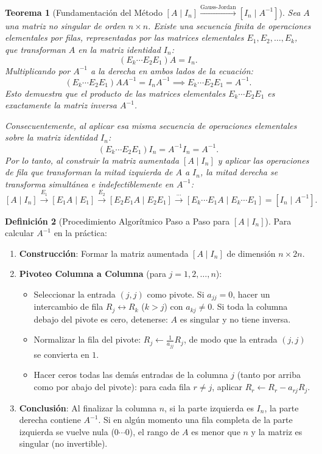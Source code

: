 \documentclass[11pt,letterpaper]{article}
\theoremstyle{definition}
\newtheorem{definicion}{Definición}[section]
\theoremstyle{plain}
\newtheorem{teorema}[definicion]{Teorema}
\begin{document}
\begin{teorema}[{Fundamentación del Método $[A \mid I_n] \xrightarrow{\text{Gauss-Jordan}} [I_n \mid A^{-1}]$}]
Sea $A$ una matriz no singular de orden $n\times n$. Existe una secuencia finita de operaciones elementales por filas, representadas por las matrices elementales $E_1, E_2, \ldots, E_k$, que transforman $A$ en la matriz identidad $I_n$:
\[
(E_k \cdots E_2 E_1) A = I_n.
\]
Multiplicando por $A^{-1}$ a la derecha en ambos lados de la ecuación:
\[
(E_k \cdots E_2 E_1) A A^{-1} = I_n A^{-1} \implies E_k \cdots E_2 E_1 = A^{-1}.
\]
Esto demuestra que el producto de las matrices elementales $E_k \cdots E_2 E_1$ es exactamente la matriz inversa $A^{-1}$.

Consecuentemente, al aplicar esa misma secuencia de operaciones elementales sobre la matriz identidad $I_n$:
\[
(E_k \cdots E_2 E_1) I_n = A^{-1} I_n = A^{-1}.
\]
Por lo tanto, al construir la matriz aumentada $[A \mid I_n]$ y aplicar las operaciones de fila que transforman la mitad izquierda de $A$ a $I_n$, la mitad derecha se transforma simultánea e indefectiblemente en $A^{-1}$:
\[
[A \mid I_n] \xrightarrow{E_1} [E_1 A \mid E_1] \xrightarrow{E_2} [E_2 E_1 A \mid E_2 E_1] \xrightarrow{\cdots} [E_k \cdots E_1 A \mid E_k \cdots E_1] = [I_n \mid A^{-1}].
\]
\end{teorema}

\begin{definicion}[{Procedimiento Algorítmico Paso a Paso para $[A \mid I_n]$}]
Para calcular $A^{-1}$ en la práctica:
\begin{enumerate}[label=\textbf{Paso \arabic*:}]
  \item \textbf{Construcción}: Formar la matriz aumentada $[A \mid I_n]$ de dimensión $n \times 2n$.
  \item \textbf{Pivoteo Columna a Columna} (para $j = 1, 2, \ldots, n$):
    \begin{itemize}
      \item Seleccionar la entrada $(j,j)$ como pivote. Si $a_{jj} = 0$, hacer un intercambio de fila $R_j \leftrightarrow R_k$ ($k > j$) con $a_{kj} \neq 0$. Si toda la columna debajo del pivote es cero, detenerse: $A$ es singular y no tiene inversa.
      \item Normalizar la fila del pivote: $R_j \leftarrow \frac{1}{a_{jj}} R_j$, de modo que la entrada $(j,j)$ se convierta en $1$.
      \item Hacer ceros todas las demás entradas de la columna $j$ (tanto por arriba como por abajo del pivote): para cada fila $r \neq j$, aplicar $R_r \leftarrow R_r - a_{rj} R_j$.
    \end{itemize}
  \item \textbf{Conclusión}: Al finalizar la columna $n$, si la parte izquierda es $I_n$, la parte derecha contiene $A^{-1}$. Si en algún momento una fila completa de la parte izquierda se vuelve nula ($0 \cdots 0$), el rango de $A$ es menor que $n$ y la matriz es singular (no invertible).
\end{enumerate}
\end{definicion}
\end{document}
